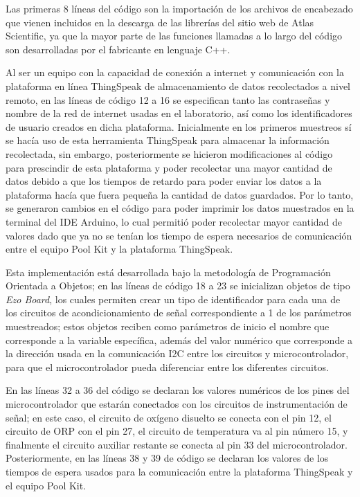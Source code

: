 Las primeras 8 líneas del código son la importación de los archivos de encabezado que vienen incluidos en la descarga de las librerías del sitio web de Atlas Scientific, ya que la mayor parte de las funciones llamadas a 
lo largo del código son desarrolladas por el fabricante en lenguaje C++.

Al ser un equipo con la capacidad de conexión a internet y comunicación con la plataforma en línea ThingSpeak de almacenamiento de datos recolectados a nivel remoto, en las líneas de código 12 a 16 se especifican tanto las 
contraseñas y nombre de la red de internet usadas en el laboratorio, así como los identificadores de usuario creados en dicha plataforma. Inicialmente en los primeros muestreos sí se hacía uso de esta herramienta ThingSpeak 
para almacenar la información recolectada, sin embargo, posteriormente se hicieron modificaciones al código para prescindir de esta plataforma y poder recolectar una mayor cantidad de datos debido a que los tiempos de retardo 
para poder enviar los datos a la plataforma hacía que fuera pequeña la cantidad de datos guardados. Por lo tanto, se generaron cambios en el código para poder imprimir los datos muestrados en la terminal del IDE Arduino, lo 
cual permitió poder recolectar mayor cantidad de valores dado que ya no se tenían los tiempo de espera necesarios de comunicación entre el equipo Pool Kit y la plataforma ThingSpeak.

Esta implementación está desarrollada bajo la metodología de Programación Orientada a Objetos; en las líneas de código 18 a 23 se inicializan objetos de tipo \textit{Ezo Board}, los cuales permiten crear un tipo de identificador 
para cada una de los circuitos de acondicionamiento de señal correspondiente a 1 de los parámetros muestreados; estos objetos reciben como parámetros de inicio el nombre que corresponde a la variable específica, además del 
valor numérico que corresponde a la dirección usada en la comunicación I2C entre los circuitos y microcontrolador, para que el microcontrolador pueda diferenciar entre los diferentes circuitos.

En las líneas 32 a 36 del código se declaran los valores numéricos de los pines del microcontrolador que estarán conectados con los circuitos de instrumentación de señal; en este caso, el circuito de oxígeno disuelto se 
conecta con el pin 12, el circuito de ORP con el pin 27, el circuito de temperatura va al pin número 15, y finalmente el circuito auxiliar restante se conecta al pin 33 del microcontrolador. Posteriormente, en las líneas 
38 y 39 de código se declaran los valores de los tiempos de espera usados para la comunicación entre la plataforma ThingSpeak y el equipo Pool Kit.

